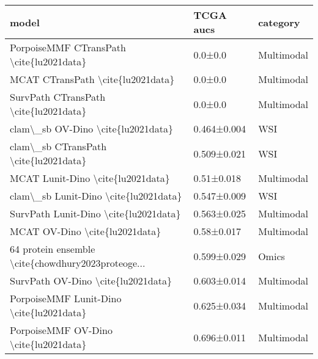 \begin{tabular}{lll}
\toprule
                                             model &   TCGA aucs &   category \\
\midrule
          PorpoiseMMF CTransPath \textbackslash cite\{lu2021data\} &     0.0±0.0 & Multimodal \\
                 MCAT CTransPath \textbackslash cite\{lu2021data\} &     0.0±0.0 & Multimodal \\
             SurvPath CTransPath \textbackslash cite\{lu2021data\} &     0.0±0.0 & Multimodal \\
                clam\textbackslash \_sb OV-Dino \textbackslash cite\{lu2021data\} & 0.464±0.004 &        WSI \\
             clam\textbackslash \_sb CTransPath \textbackslash cite\{lu2021data\} & 0.509±0.021 &        WSI \\
                 MCAT Lunit-Dino \textbackslash cite\{lu2021data\} &  0.51±0.018 & Multimodal \\
             clam\textbackslash \_sb Lunit-Dino \textbackslash cite\{lu2021data\} & 0.547±0.009 &        WSI \\
             SurvPath Lunit-Dino \textbackslash cite\{lu2021data\} & 0.563±0.025 & Multimodal \\
                    MCAT OV-Dino \textbackslash cite\{lu2021data\} &  0.58±0.017 & Multimodal \\
64 protein ensemble \textbackslash cite\{chowdhury2023proteoge... & 0.599±0.029 &      Omics \\
                SurvPath OV-Dino \textbackslash cite\{lu2021data\} & 0.603±0.014 & Multimodal \\
          PorpoiseMMF Lunit-Dino \textbackslash cite\{lu2021data\} & 0.625±0.034 & Multimodal \\
             PorpoiseMMF OV-Dino \textbackslash cite\{lu2021data\} & 0.696±0.011 & Multimodal \\
\bottomrule
\end{tabular}
